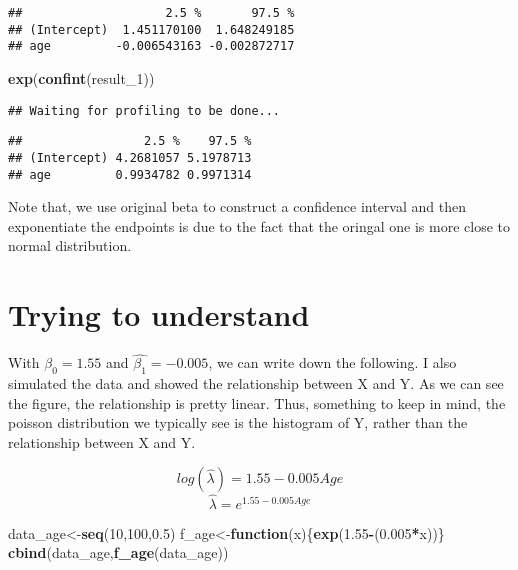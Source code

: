 \documentclass[]{book}
\newenvironment{Shaded}{\begin{snugshade}}{\end{snugshade}}
\newcommand{\ControlFlowTok}[1]{\textcolor[rgb]{0.13,0.29,0.53}{\textbf{#1}}}
\newcommand{\DecValTok}[1]{\textcolor[rgb]{0.00,0.00,0.81}{#1}}
\newcommand{\FloatTok}[1]{\textcolor[rgb]{0.00,0.00,0.81}{#1}}
\newcommand{\KeywordTok}[1]{\textcolor[rgb]{0.13,0.29,0.53}{\textbf{#1}}}
\newcommand{\NormalTok}[1]{#1}
\newcommand{\OperatorTok}[1]{\textcolor[rgb]{0.81,0.36,0.00}{\textbf{#1}}}
\begin{document}
\begin{verbatim}
##                    2.5 %       97.5 %
## (Intercept)  1.451170100  1.648249185
## age         -0.006543163 -0.002872717
\end{verbatim}

\begin{Shaded}
\begin{Highlighting}[]
\KeywordTok{exp}\NormalTok{(}\KeywordTok{confint}\NormalTok{(result_}\DecValTok{1}\NormalTok{))}
\end{Highlighting}
\end{Shaded}

\begin{verbatim}
## Waiting for profiling to be done...
\end{verbatim}

\begin{verbatim}
##                 2.5 %    97.5 %
## (Intercept) 4.2681057 5.1978713
## age         0.9934782 0.9971314
\end{verbatim}

Note that, we use original beta to construct a confidence interval and then exponentiate the endpoints is due to the fact that the oringal one is more close to normal distribution.

\hypertarget{trying-to-understand}{%
\section{Trying to understand}\label{trying-to-understand}}

With \(\hat{\beta_0} = 1.55\) and \(\hat{\beta_1}=-0.005\), we can write down the following. I also simulated the data and showed the relationship between X and Y. As we can see the figure, the relationship is pretty linear. Thus, something to keep in mind, the poisson distribution we typically see is the histogram of Y, rather than the relationship between X and Y.

\[log(\hat{\lambda})=1.55-0.005 Age\]
\[\hat{\lambda}=e^{1.55-0.005 Age}\]

\begin{Shaded}
\begin{Highlighting}[]
\NormalTok{data_age<-}\KeywordTok{seq}\NormalTok{(}\DecValTok{10}\NormalTok{,}\DecValTok{100}\NormalTok{,}\FloatTok{0.5}\NormalTok{)}
\NormalTok{f_age<-}\ControlFlowTok{function}\NormalTok{(x)\{}\KeywordTok{exp}\NormalTok{(}\FloatTok{1.55}\OperatorTok{-}\NormalTok{(}\FloatTok{0.005}\OperatorTok{*}\NormalTok{x))\}}
\KeywordTok{cbind}\NormalTok{(data_age,}\KeywordTok{f_age}\NormalTok{(data_age))}
\end{Highlighting}
\end{Shaded}
\end{document}
